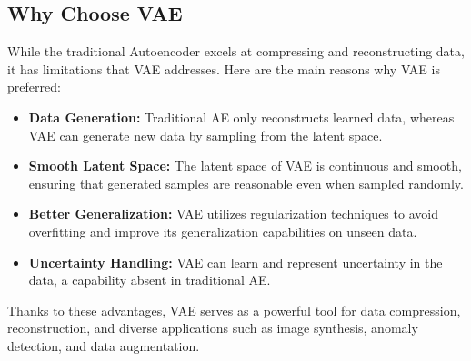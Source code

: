 \subsection{Why Choose VAE}

While the traditional Autoencoder excels at compressing and reconstructing data, it has limitations that VAE addresses. Here are the main reasons why VAE is preferred:

\begin{itemize}
    \item \textbf{Data Generation:}  
    Traditional AE only reconstructs learned data, whereas VAE can generate new data by sampling from the latent space.

    \item \textbf{Smooth Latent Space:}  
    The latent space of VAE is continuous and smooth, ensuring that generated samples are reasonable even when sampled randomly.

    \item \textbf{Better Generalization:}  
    VAE utilizes regularization techniques to avoid overfitting and improve its generalization capabilities on unseen data.

    \item \textbf{Uncertainty Handling:}  
    VAE can learn and represent uncertainty in the data, a capability absent in traditional AE.
\end{itemize}

Thanks to these advantages, VAE serves as a powerful tool for data compression, reconstruction, and diverse applications such as image synthesis, anomaly detection, and data augmentation.